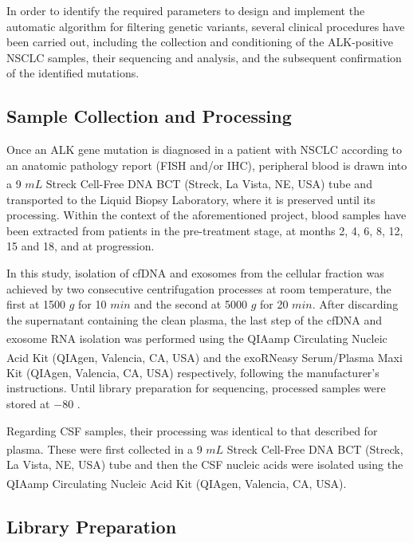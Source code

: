 In order to identify the required parameters to design and implement the automatic algorithm for filtering genetic variants, several clinical procedures have been carried out, including the collection and conditioning of the ALK-positive NSCLC samples, their sequencing and analysis, and the subsequent confirmation of the identified mutations.

\subsection{Sample Collection and Processing}

Once an ALK gene mutation is diagnosed in a patient with NSCLC according to an anatomic pathology report (FISH and\slash or IHC), peripheral blood is drawn into a 9 $mL$ Streck Cell-Free DNA BCT\textsuperscript\textregistered{} (Streck, La Vista, NE, USA) tube and transported to the Liquid Biopsy Laboratory, where it is preserved until its processing. Within the context of the aforementioned project, blood samples have been extracted from patients in the pre-treatment stage, at months 2, 4, 6, 8, 12, 15 and 18, and at progression.

In this study, isolation of cfDNA and exosomes from the cellular fraction was achieved by two consecutive centrifugation processes at room temperature, the first at 1500 $g$ for 10 $min$ and the second at 5000 $g$ for 20 $min$. After discarding the supernatant containing the clean plasma, the last step of the cfDNA and exosome RNA isolation was performed using the QIAamp\textsuperscript\textregistered{} Circulating Nucleic Acid Kit (QIAgen, Valencia, CA, USA) and the exoRNeasy\textsuperscript\textregistered{} Serum/Plasma Maxi Kit (QIAgen, Valencia, CA, USA) respectively, following the manufacturer's instructions. Until library preparation for sequencing, processed samples were stored at $-80$ .

Regarding CSF samples, their processing was identical to that described for plasma. These were first collected in a 9 $mL$ Streck Cell-Free DNA BCT\textsuperscript\textregistered{} (Streck, La Vista, NE, USA) tube and then the CSF nucleic acids were isolated using the QIAamp\textsuperscript\textregistered{} Circulating Nucleic Acid Kit (QIAgen, Valencia, CA, USA).

\subsection{Library Preparation}

